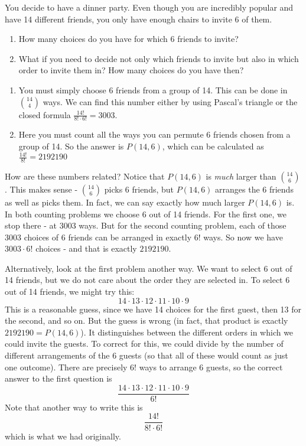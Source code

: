 \documentclass[12pt]{article}
\begin{document}
\begin{example}
  You decide to have a dinner party.  Even though you are incredibly popular and have 14 different friends, you only have enough chairs to invite 6 of them.  
  \begin{enumerate}
    \item How many choices do you have for which 6 friends to invite? 
    \item What if you need to decide not only which friends to invite but also in which order to invite them in?  How many choices do you have then?
  \end{enumerate}
  \begin{solution}
    \begin{enumerate}

      \item You must simply choose 6 friends from a group of 14.  This can be done in ${14 \choose 4}$ ways.  We can find this number either by using Pascal's triangle or the closed formula $\frac{14!}{8!\cdot 6!} = 3003$.
      
      \item Here you must count all the ways you can permute 6 friends chosen from a group of 14.  So the answer is $P(14, 6)$, which can be calculated as $\frac{14!}{8!} = 2192190$
   \end{enumerate}
    How are these numbers related?  Notice that $P(14,6)$ is {\em much} larger than ${14 \choose 6}$.  This makes sense - ${14 \choose 6}$ picks 6 friends, but $P(14,6)$  arranges the 6 friends as well as picks them.  In fact, we can say exactly how much larger $P(14,6)$ is.  In both counting problems we choose 6 out of 14 friends.  For the first one, we stop there - at 3003 ways.  But for the second counting problem, each of those 3003 choices of 6 friends can be arranged in exactly $6!$ ways.  So now we have $3003\cdot 6!$ choices - and that is exactly $2192190$.
    
    Alternatively, look at the first problem another way.  We want to select 6 out of 14 friends, but we do not care about the order they are selected in.  To select 6 out of 14 friends, we might try this:
    \[14 \cdot 13 \cdot 12 \cdot 11 \cdot 10 \cdot 9\]
    This is a reasonable guess, since we have 14 choices for the first guest, then 13 for the second, and so on.  But the guess is wrong (in fact, that product is exactly $2192190 = P(14,6)$).  It distinguishes between the different orders in which we could invite the guests.  To correct for this, we could divide by the number of different arrangements of the 6 guests (so that all of these would count as just one outcome).  There are precisely $6!$ ways to arrange 6 guests, so the correct answer to the first question is
    \[\frac{14 \cdot 13 \cdot 12 \cdot 11\cdot 10 \cdot 9}{6!}\]
    Note that another way to write this is
    \[\frac{14!}{8!\cdot 6!}\]
    which is what we had originally.
  \end{solution}

\end{example}
\end{document}
